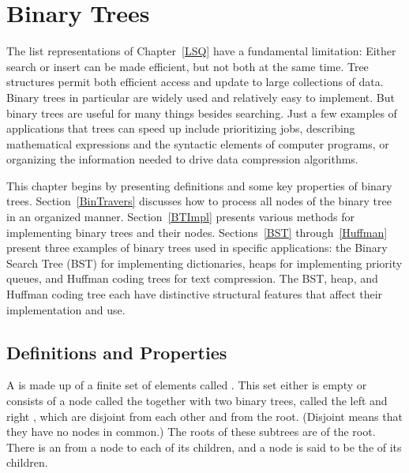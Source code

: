 
\chapter{Binary Trees}
\label{BinaryTree}
\def\CHHEAD{Chap.\ \thechapter\ Binary Trees}    %

The list representations of Chapter~\ref{LSQ} have a
fundamental limitation:
Either search or insert can be made efficient, but not both at the
same time.
Tree structures permit both efficient access and update to
large collections of data.
Binary trees in particular are widely used and relatively easy to
implement.
But binary trees are useful for many things besides searching.
Just a few examples of applications that trees can speed up include
prioritizing jobs, describing mathematical expressions and the
syntactic elements of computer programs,
or organizing the information needed to drive data compression
algorithms.

This chapter begins by presenting definitions and some key properties
of binary trees.
Section~\ref{BinTravers} discusses how to process all nodes of the
binary tree in an organized manner.
Section~\ref{BTImpl} presents various methods for implementing binary
trees and their nodes.
Sections~\ref{BST} through~\ref{Huffman} present three examples
of binary trees used in specific applications:
the Binary Search Tree (BST) for implementing dictionaries,
heaps for implementing priority queues,
and Huffman coding
trees for text compression.
The BST, heap, and Huffman coding tree each have distinctive
structural features that affect their implementation and use.

\section{Definitions and Properties}
\label{BTProper}

A  is made up of a finite set of elements called
.
This set either is empty or consists of a node called the
 together with two binary trees, called the left and right
, which are disjoint from each other and from the
root.
(Disjoint means that they have no nodes in common.)
The roots of these subtrees are  of the root.
There is an  from a node to each of its children, and a
node is said to be the  of its children.

